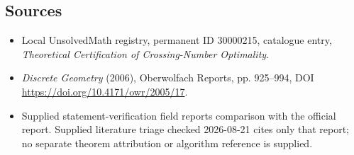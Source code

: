 \documentclass[11pt]{article}
\begin{document}
\subsection{Sources}
\begin{itemize}
\item Local UnsolvedMath registry, permanent ID 30000215, catalogue entry, \emph{Theoretical Certification of Crossing-Number Optimality}.
\item \emph{Discrete Geometry} (2006), Oberwolfach Reports, pp. 925--994, DOI \url{https://doi.org/10.4171/owr/2005/17}.
\item Supplied statement-verification field reports comparison with the official report. Supplied literature triage checked 2026-08-21 cites only that report; no separate theorem attribution or algorithm reference is supplied.
\end{itemize}
\end{document}
